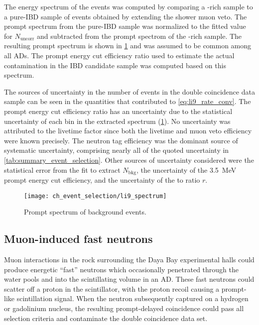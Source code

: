 The energy spectrum of the \li{} events was computed
by comparing a \li{}-rich sample to a pure-IBD sample of events
obtained by extending the shower muon veto.
The prompt spectrum from the pure-IBD sample
was normalized to the fitted value for $N_\text{uncorr}$
and subtracted from the prompt spectrom of the \li{}-rich sample.
The resulting \li{} prompt spectrum is shown in \cref{fig:li9_spec}
and was assumed to be common among all ADs.
The prompt energy cut efficiency ratio
used to estimate the actual contamination in the IBD candidate sample
was computed based on this spectrum.

The sources of uncertainty in the number of \li{} events
in the double coincidence data sample
can be seen in the quantities that contributed to \cref{eq:li9_rate_conv}.
The prompt energy cut efficiency ratio has an uncertainty
due to the statistical uncertainty of each bin in the extracted \li{} spectrum
(\cref{fig:li9_spec}).
No uncertainty was attributed to the livetime factor since
both the livetime and muon veto efficiency were known precisely.
The neutron tag efficiency
was the dominant source of systematic uncertainty,
comprising nearly all of the quoted uncertainty in \cref{tab:summary_event_selection}.
Other sources of uncertainty considered were
the statistical error from the fit to extract $N_\text{bkg}$,
the uncertainty of the \SI{3.5}{\MeV} prompt energy cut efficiency,
and the uncertainty of the \li{} to \he{} ratio $r$.

\begin{figure}
    \centering
    \texttt{[image: ch\_event\_selection/li9\_spectrum]}
    \caption{
        Prompt spectrum of \li{} background events.
    }
    \label{fig:li9_spec}
\end{figure}

\subsection{Muon-induced fast neutrons}
\label{subsec:fastn}

Muon interactions in the rock surrounding the Daya Bay experimental halls
could produce energetic ``fast'' neutrons
which occasionally penetrated through the water pools
and into the scintillating volume in an AD.
These fast neutrons could scatter off a proton in the scintillator,
with the proton recoil causing a prompt-like scintillation signal.
When the neutron subsequently captured on a hydrogen or gadolinium nucleus,
the resulting prompt-delayed coincidence
could pass all selection criteria and contaminate the double coincidence data set.

